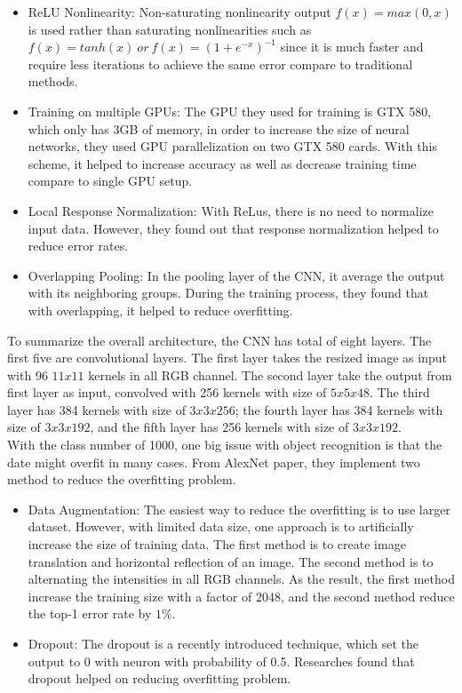 \documentclass[12pt]{article}
\begin{document}
\begin{itemize}
\item ReLU Nonlinearity: Non-saturating nonlinearity output $f(x)=max(0,x)$ is used rather than saturating nonlinearities such as $f(x)=tanh(x)\ or \ f(x)=(1+e^{-x})^{-1}$ since it is much faster and require less iterations to achieve the same error compare to traditional methods\citep{alexnet}.
\item Training on multiple GPUs: The GPU they used for training is GTX 580, which only has 3GB of memory, in order to increase the size of neural networks, they used GPU parallelization on two GTX 580 cards. With this scheme, it helped to increase accuracy as well as decrease training time compare to single GPU setup\citep{alexnet}.
\item Local Response Normalization: With ReLus, there is no need to normalize input data. However, they found out that response normalization helped to reduce error rates.
\item Overlapping Pooling: In the pooling layer of the CNN, it average the output with its neighboring groups. During the training process, they found that with overlapping, it helped to reduce overfitting.
\end{itemize}
\noindent
To summarize the overall architecture, the CNN has total of eight layers. The first five are convolutional layers. The first layer takes the resized image as input with 96 $11x11 $ kernels in all RGB channel. The second layer take the output from first layer  as input, convolved with 256 kernels with size of $5x5x48$. The third layer has 384 kernels with size of $3x3x256$; the fourth layer has 384 kernels with size of $3x3x192$, and the fifth layer has 256 kernels with size of $3x3x192$\citep{alexnet}.\\
\noindent
With the class number of 1000, one big issue with object recognition is that the date might overfit in many cases. From AlexNet paper, they implement two method to reduce the overfitting problem.
\begin{itemize}
\item Data Augmentation: The easiest way to reduce the overfitting is to use larger dataset. However, with limited data size, one approach is to artificially increase the size of training data. The first method is to create image translation and horizontal reflection of an image. The second method is to alternating the intensities in all RGB channels. As the result, the first method increase the training size with a factor of 2048, and the second method reduce the top-1 error rate by $1\%$\citep{alexnet}.
\item Dropout: The dropout is a recently introduced technique, which set the output to 0 with neuron with probability of 0.5. Researches found that dropout helped on reducing overfitting problem\citep{alexnet}. 
\end{itemize}
\end{document}
